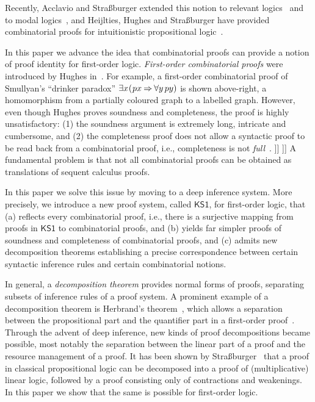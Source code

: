 \documentclass[conference,twosided,10pt]{IEEEtran}
\newcommand{\lutz}[1]{{\color{blue}     \noindent[\![\![{\bf Lutz: }#1]\!]\!]}}
\newcommand{\todo}[1]{{\color{red}     \noindent[\![\![{\bf TODO: }#1]\!]\!]}}
\theoremstyle{definition}
\newcommand*{\FOKS}{\mathsf{KS1}}
\begin{document}
Recently, Acclavio and Stra\ss burger extended this notion to relevant
logics~\cite{acc:str:relevant} and to modal
logics~\cite{acc:str:modal}, and Heijlties, Hughes and Stra\ss burger
have provided combinatorial proofs for intuitionistic propositional
logic~\cite{HHS:lics19}.

In this paper we advance the idea that combinatorial proofs can provide
a notion of proof identity for first-order logic. \emph{First-order
combinatorial proofs} were introduced by Hughes in~\cite{hughes:fopws}.
For example, a first-order combinatorial proof of Smullyan's 
``drinker paradox'' $\exists x\mkern1mu(\mkern1mu px\mkern-1mu\Rightarrow\mkern-1mu \forall y \mkern3mu p y)$ is shown above-right,
a homomorphism from a partially coloured graph to a labelled graph.
However, even though Hughes proves soundness and completeness, the 
proof is highly unsatisfactory: (1) the soundness argument is extremely
long, intricate and cumbersome, and (2) the completeness proof does not 
allow a syntactic proof to be read back from a combinatorial proof, i.e.,
completeness is not \emph{full}~\cite{abramsky:jagadeesan:94}.\todo{cite something for full comp?}\lutz{is that enough?}
A fundamental problem is that not all combinatorial
proofs can be obtained as translations of sequent calculus proofs.

In this paper we solve this issue by moving to a deep inference
system. More precisely, we introduce a new proof system, called
$\FOKS$, for first-order logic, that (a) reflects every combinatorial
proof, i.e., there is a surjective mapping from proofs in $\FOKS$ to
combinatorial proofs, and (b) yields far simpler proofs of
soundness and completeness of combinatorial proofs, and (c) admits
new decomposition theorems establishing a precise correspondence
between certain syntactic inference rules and certain combinatorial
notions.

In general, a \emph{decomposition theorem} provides normal forms of
proofs, separating subsets of inference rules of a proof system. A
prominent example of a decomposition theorem is Herbrand's
theorem~\cite{herbrand:phd}, which allows a separation between the
propositional part and the quantifier part in a first-order
proof~\cite{gentzen:35:II,brunnler:06:herbrand}. Through the advent of
deep inference, new kinds of proof decompositions became possible,
most notably the separation between the linear part of a proof and the
resource management of a proof. It has been shown by
Stra{\ss}burger~\cite{str:07:RTA} that a proof in classical
propositional logic can be decomposed into a proof of (multiplicative)
linear logic, followed by a proof consisting only of contractions and
weakenings. In this paper we show that the same is possible for
first-order logic.
\end{document}
